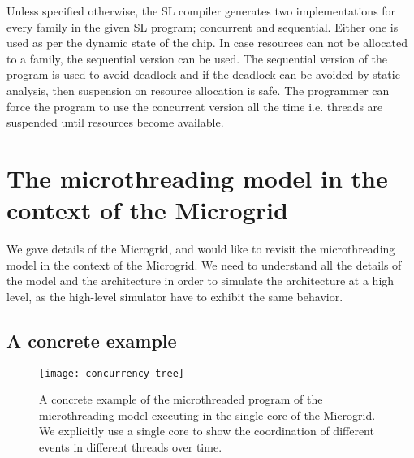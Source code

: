 \documentclass{article}
\begin{document}
Unless specified otherwise, the SL compiler generates two implementations for
every family in the given SL program; concurrent and sequential. Either one is
used as per the dynamic state of the chip. In case resources can not be
allocated to a family, the sequential version can be used. The sequential
version of the program is used to avoid deadlock and if the deadlock can be
avoided by static analysis, then suspension on resource allocation is safe. The
programmer can force the program to use the concurrent version all the time
i.e. threads are suspended until resources become available. 

\section{The microthreading model in the context of the Microgrid}
\label{sn:microthreading_microgrid}

We gave details of the Microgrid, and would like to revisit the microthreading
model in the context of the Microgrid. We need to understand all the details of
the model and the architecture in order to simulate the architecture at a
high level, as the high-level simulator have to exhibit the same behavior.

\subsection{A concrete example}

\begin{figure}

\begin{centering}

\texttt{[image: concurrency-tree]}

\caption{\label{fig:concurrency_tree}A concrete example of the microthreaded
program of the microthreading model executing in the single core of the
Microgrid. We explicitly use a single core to show the coordination of
different events in different threads over time.}

\end{centering}

\end{figure}
\end{document}
